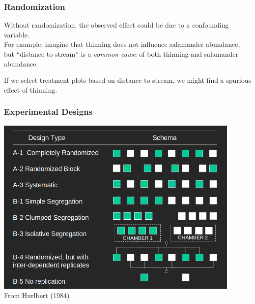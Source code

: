 \documentclass[color=usenames,dvipsnames]{beamer}\usepackage[]{graphicx}\usepackage[]{color}
\begin{document}
\begin{frame}
  \frametitle{Randomization}
  \small
  Without randomization, the observed effect could be due to a
  confounding variable. \\ %
  \vfill
  For example, imagine that thinning does not influence salamander
  abundance, but ``distance to stream'' is a {\it common cause} of
  both thinning and salamander abundance. \\ 
  \vfill
  \begin{center}
 \end{center}
 \pause
 \vfill
 If we select treatment plots based on distance to stream, we might
 find a spurious effect of thinning.  
\end{frame}






\begin{frame}
  \frametitle{Experimental Designs}
  \centering
  \includegraphics[width=0.9\textwidth]{Hurlbert-schema} \\
  From Hurlbert (1984) \\
\end{frame}
\end{document}

